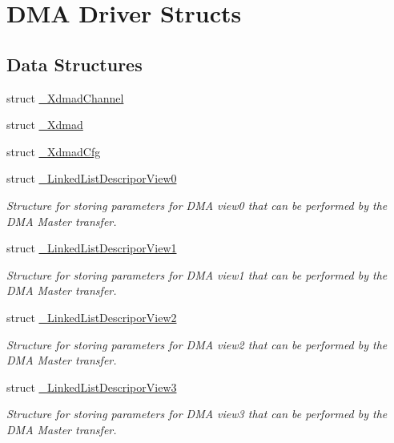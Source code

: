 \hypertarget{group__dmad__structs}{}\section{D\+MA Driver Structs}
\label{group__dmad__structs}
\subsection*{Data Structures}
\begin{DoxyCompactItemize}
\item 
struct \mbox{\hyperlink{struct__XdmadChannel}{\+\_\+\+Xdmad\+Channel}}
\item 
struct \mbox{\hyperlink{struct__Xdmad}{\+\_\+\+Xdmad}}
\item 
struct \mbox{\hyperlink{struct__XdmadCfg}{\+\_\+\+Xdmad\+Cfg}}
\item 
struct \mbox{\hyperlink{struct__LinkedListDescriporView0}{\+\_\+\+Linked\+List\+Descripor\+View0}}
\begin{DoxyCompactList}\small\item\em Structure for storing parameters for D\+MA view0 that can be performed by the D\+MA Master transfer. \end{DoxyCompactList}\item 
struct \mbox{\hyperlink{struct__LinkedListDescriporView1}{\+\_\+\+Linked\+List\+Descripor\+View1}}
\begin{DoxyCompactList}\small\item\em Structure for storing parameters for D\+MA view1 that can be performed by the D\+MA Master transfer. \end{DoxyCompactList}\item 
struct \mbox{\hyperlink{struct__LinkedListDescriporView2}{\+\_\+\+Linked\+List\+Descripor\+View2}}
\begin{DoxyCompactList}\small\item\em Structure for storing parameters for D\+MA view2 that can be performed by the D\+MA Master transfer. \end{DoxyCompactList}\item 
struct \mbox{\hyperlink{struct__LinkedListDescriporView3}{\+\_\+\+Linked\+List\+Descripor\+View3}}
\begin{DoxyCompactList}\small\item\em Structure for storing parameters for D\+MA view3 that can be performed by the D\+MA Master transfer. \end{DoxyCompactList}\end{DoxyCompactItemize}
